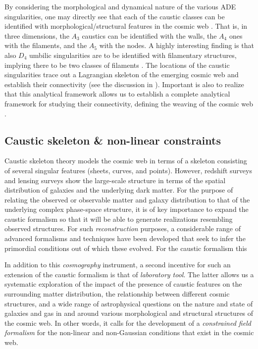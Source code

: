 \documentclass[a4paper, 11pt]{article}
\begin{document}
By considering the morphological and dynamical nature of the various ADE singularities, one may directly see that each of the caustic classes can be identified with morphological/structural features in the cosmic web \cite{Feldbrugge:2018}. That is, in three dimensions, the $A_3$ caustics can be identified with the walls, the $A_4$ ones with the filaments, and the $A_5$ with the nodes. A highly interesting finding is that also $D_4$ umbilic singularities are to be identified with filamentary structures, implying there to be two classes of filaments \cite{Feldbrugge:2018}. The locations of the caustic singularities trace out a Lagrangian skeleton of the emerging cosmic web and establish their connectivity (see the discussion in \cite{Hidding:2014}). Important is also to realize that this analytical framework allows us to establish a complete analytical framework for studying their connectivity, defining the weaving of the cosmic web \cite{Zeldovich:1970,Bond:1996,Weygaert:1996,Aragon:2010a,Aragon:2010b,Cautun:2014}.

\subsection{Caustic skeleton \& non-linear constraints}
Caustic skeleton theory models the cosmic web in terms of a skeleton consisting of several singular features (sheets, curves, and points). However, redshift surveys and lensing surveys show the large-scale structure in terms of the spatial distribution of galaxies and the underlying dark matter. For the purpose of relating the observed or observable matter and galaxy distribution to that of the underlying complex phase-space structure, it is of key importance to expand the caustic formalism so that it will be able to generate realizations resembling observed structures. For such {\it reconstruction} purposes, a considerable range of advanced formalisms and techniques have been developed that seek to infer the primordial conditions out of which these evolved. For the caustic formalism this 

In addition to this {\it cosmography} instrument, a second incentive for such an extension of the caustic formalism is that of {\it laboratory tool}. The latter allows us a systematic exploration of the impact of the presence of caustic features on the surrounding matter distribution, the relationship between different cosmic structures, and a wide range of astrophysical questions on the nature and state of galaxies and gas in and around various morphological and structural structures of the cosmic web. In other words, it calls for the development of a {\it constrained field formalism} for the non-linear and non-Gaussian conditions that exist in the cosmic web. 
\end{document}
